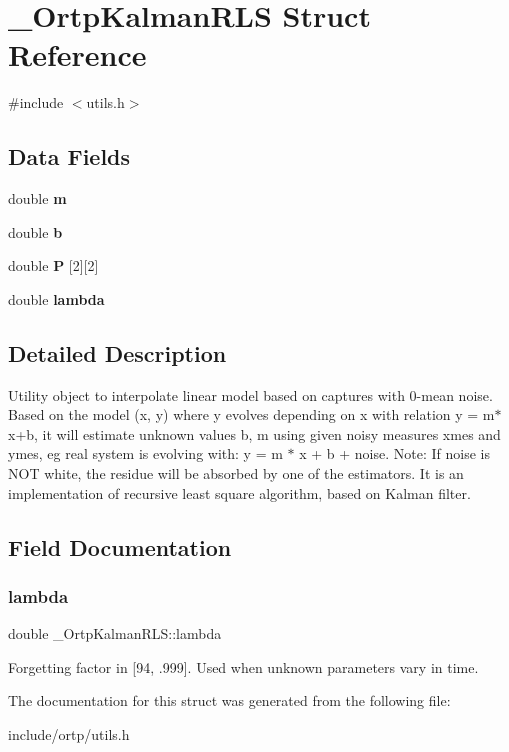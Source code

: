 \section{\+\_\+\+Ortp\+Kalman\+R\+LS Struct Reference}
\label{struct__OrtpKalmanRLS}


{\ttfamily \#include $<$utils.\+h$>$}

\subsection*{Data Fields}
\begin{DoxyCompactItemize}
\item 
\mbox{\label{struct__OrtpKalmanRLS_ae06a3091f91ab01484deefb53b934748}} 
double {\bfseries m}
\item 
\mbox{\label{struct__OrtpKalmanRLS_ac4c62359e5079cd3f4e147826f43a2d0}} 
double {\bfseries b}
\item 
\mbox{\label{struct__OrtpKalmanRLS_a42f06f7bde2a34c9be2c1e7807fef479}} 
double {\bfseries P} [2][2]
\item 
double \textbf{ lambda}
\end{DoxyCompactItemize}


\subsection{Detailed Description}
Utility object to interpolate linear model based on captures with 0-\/mean noise. Based on the model (x, y) where y evolves depending on x with relation y = m$\ast$x+b, it will estimate unknown values b, m using given noisy measures xmes and ymes, eg real system is evolving with\+: y = m $\ast$ x + b + noise. Note\+: If noise is N\+OT white, the residue will be absorbed by one of the estimators. It is an implementation of recursive least square algorithm, based on Kalman filter. 

\subsection{Field Documentation}
\mbox{\label{struct__OrtpKalmanRLS_a52bf5eb9d6d2e55cd3f8ca674f8a8590}} 
\subsubsection{lambda}
{\footnotesize\ttfamily double \+\_\+\+Ortp\+Kalman\+R\+L\+S\+::lambda}

Forgetting factor in [94, .999]. Used when unknown parameters vary in time. 

The documentation for this struct was generated from the following file\+:\begin{DoxyCompactItemize}
\item 
include/ortp/utils.\+h\end{DoxyCompactItemize}
